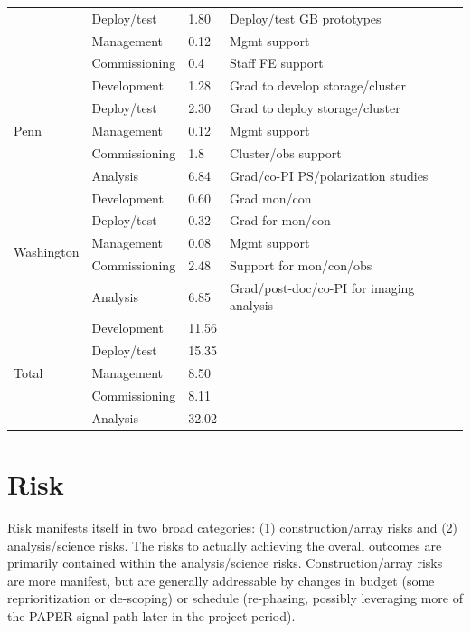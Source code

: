 \documentclass[preprint]{aastex}
\begin{document}
\begin{table}[th]
\begin{tabular}{| p{1in} | p{1in} | p{0.5in} | p{3in} |}
                                                & Deploy/test   & 1.80  & Deploy/test GB prototypes \\ 
                                                & Management  & 0.12  & Mgmt support\\ 
                                                & Commissioning & 0.4 & Staff FE support \\ \hline
\multirow{5}{*}{Penn}              & Development & 1.28 & Grad to develop storage/cluster \\ 
                                                & Deploy/test   & 2.30  & Grad to deploy storage/cluster\\
                                                & Management  &  0.12 & Mgmt support \\ 
                                                & Commissioning & 1.8 & Cluster/obs support \\
                                                & Analysis         & 6.84 & Grad/co-PI PS/polarization studies \\  \hline
\multirow{5}{*}{Washington} & Development & 0.60 & Grad mon/con \\
                                                & Deploy/test   & 0.32 & Grad for mon/con \\ 
                                                & Management  &  0.08 & Mgmt support \\ 
                                                & Commissioning     & 2.48 & Support for mon/con/obs \\
                                                & Analysis         & 6.85 & Grad/post-doc/co-PI for imaging analysis \\  \hline
\multirow{5}{*}{Total} & Development & 11.56 &  \\
                                                & Deploy/test   & 15.35 &  \\ 
                                                & Management  &  8.50 &  \\ 
                                                & Commissioning   & 8.11 &  \\
                                                & Analysis         & 32.02 &  \\ \hline
\end{tabular}
\end{table}

\section{Risk}
\label{sec:risk}
Risk manifests itself in two broad categories: (1) construction/array risks and (2)
analysis/science risks. The risks to actually achieving the overall outcomes are
primarily contained within the analysis/science risks. Construction/array risks are
more manifest, but are generally addressable by changes in budget (some
reprioritization or de-scoping) or schedule (re-phasing, possibly leveraging more of
the PAPER signal path later in the project period).
\end{document}
